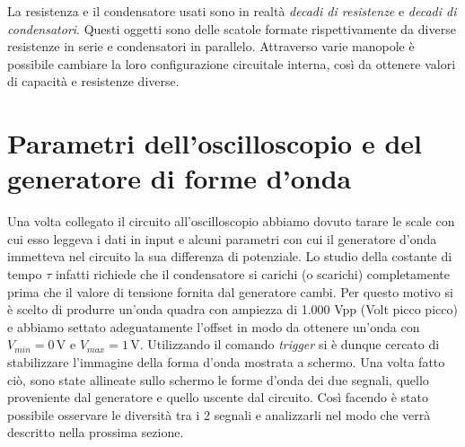 La resistenza e il condensatore usati sono in realtà \textit{decadi di resistenze} e \textit{decadi di condensatori}. Questi oggetti sono delle scatole formate rispettivamente da diverse resistenze in serie e condensatori in parallelo. Attraverso varie manopole è possibile cambiare la loro configurazione circuitale interna, così da ottenere valori di capacità e resistenze diverse. 

\section{Parametri dell'oscilloscopio e del generatore di forme d'onda}

Una volta collegato il circuito all'oscilloscopio abbiamo dovuto tarare le scale con cui esso leggeva i dati in input e alcuni parametri con cui il generatore d'onda immetteva nel circuito la sua differenza di potenziale. Lo studio della costante di tempo $\tau$ infatti richiede che il condensatore si carichi (o scarichi) completamente prima che il valore di tensione fornita dal generatore cambi. Per questo motivo si è scelto di produrre un'onda quadra con ampiezza di 1.000 Vpp (Volt picco picco) e abbiamo settato adeguatamente l'offset %
in modo da ottenere un'onda con $V_{min}=0\,\si{\volt}$ e $V_{max}=1\,\si{\volt}$. Utilizzando il comando \textit{trigger} si è dunque cercato di stabilizzare l'immagine della forma d'onda mostrata a schermo. Una volta fatto ciò, sono state allineate sullo schermo le forme d'onda dei due segnali, quello proveniente dal generatore e quello uscente dal circuito. Così facendo è stato possibile osservare le diversità tra i 2 segnali e analizzarli nel modo che verrà descritto nella prossima sezione.
 